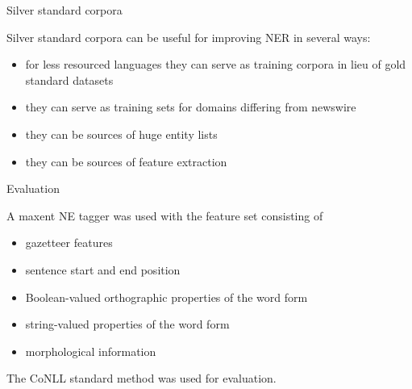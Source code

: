 \documentclass[utf8x,t]{beamer}
\begin{document}
\begin{frame}{Silver standard corpora}

Silver standard corpora can be useful for improving NER in several ways:

\smallskip

\begin{itemize}
\item for less resourced languages they can serve as training corpora in lieu of gold standard datasets
\item they can serve as training sets for domains differing from newswire
\item they can be sources of huge entity lists
\item they can be sources of feature extraction
\end{itemize}

\end{frame}

\begin{frame}{Evaluation}

\smallskip

A maxent NE tagger was used with the feature set consisting of

\smallskip

\begin{itemize}
\item gazetteer features
\item sentence start and end position
\item Boolean-valued orthographic properties of the word form
\item string-valued properties of the word form
\item morphological information
\end{itemize}

\bigskip

The CoNLL standard method was used for evaluation.

\end{frame}
\end{document}
